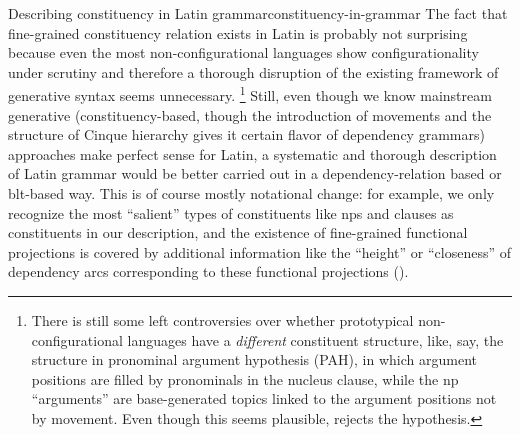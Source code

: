 \documentclass[a4paper, oneside]{report}
\begin{document}
\begin{theorybox}{Describing constituency in Latin grammar}{constituency-in-grammar}
    The fact that fine-grained constituency relation exists in Latin 
    is probably not surprising because
    even the most non-configurational languages show configurationality 
    under scrutiny
    \citep[among others]{niedzielski2017clausal,morris2018evidence,legate2002warlpiri}
    and therefore a thorough disruption 
    of the existing framework of generative syntax seems unnecessary.%
    \footnote{
        There is still some left controversies over 
        whether prototypical non-configurational languages 
        have a \emph{different} constituent structure,
        like, say, the structure in pronominal argument hypothesis (PAH),
        in which argument positions are filled by pronominals 
        in the nucleus clause,
        while the \acs{np} ``arguments'' are base-generated topics 
        linked to the argument positions not by movement.
        Even though this seems plausible, 
        \cite{legate2002warlpiri} rejects the hypothesis.
    }
    Still, even though we know mainstream generative (constituency-based, 
    though the introduction of movements and the structure of Cinque hierarchy
    gives it certain flavor of dependency grammars) approaches make perfect sense for Latin,
    a systematic and thorough description of Latin grammar 
    would be better carried out in a dependency-relation based or \acs{blt}-based way.
    This is of course mostly notational change:
    for example, we only recognize the most ``salient'' types of constituents 
    like \acs{np}s and clauses as constituents in our description,
    and the existence of fine-grained functional projections is covered by 
    additional information like the ``height'' or ``closeness'' of dependency arcs
    corresponding to these functional projections
    ().
\end{theorybox}
\end{document}
